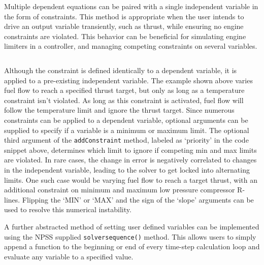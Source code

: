 \documentclass[heading.tex]{subfiles}
\begin{document}
 \begin{adjustwidth}{1cm}{-1cm}
 \inputminted[]{c++}{code/solverSetup}
 \end{adjustwidth} 


Multiple dependent equations can be paired with a single independent variable in the form of constraints.
This method is appropriate when the user intends to drive an output variable transiently,
such as thrust, while ensuring no engine constraints are violated.
This behavior can be beneficial for simulating engine limiters in a controller, and managing 
competing constraints on several variables.
 
 \begin{adjustwidth}{1cm}{-1cm}
 \inputminted[]{c++}{code/constraintSetup}
 \end{adjustwidth} 
 
Although the constraint is defined identically to a dependent variable, it is applied to a pre-existing independent variable.
The example shown above varies fuel flow to reach a specified thrust target, but only as long as a temperature constraint isn't violated.
As long as this constraint is activated, fuel flow will follow the temperature limit and ignore the thrust target.
Since numerous constraints can be applied to a dependent variable,
optional arguments can be supplied to specify if a variable is a minimum or maximum limit.
The optional third argument of the \texttt{addConstraint} method, labeled as `priority' in the code snippet above,
determines which limit to ignore if competing min and max limits are violated.
In rare cases, the change in error is negatively correlated to changes in the independent variable,
leading to the solver to get locked into alternating limits. One such case would be varying fuel flow to reach a target thrust,
with an additional constraint on minimum and maximum low pressure compressor R-lines.
Flipping the `MIN' or `MAX' and the sign of the `slope' arguments can be used to resolve this numerical instability.

A further abstracted method of setting user defined variables can be implemented using the NPSS supplied 
\texttt{solversequence()} method.
This allows users to simply append a function to the beginning or end of every time-step calculation loop
and evaluate any variable to a specified value. 
 
 \begin{adjustwidth}{-1cm}{-1cm}
 \inputminted[]{c++}{code/solverSequence}
 \end{adjustwidth} 
 
\end{document}
